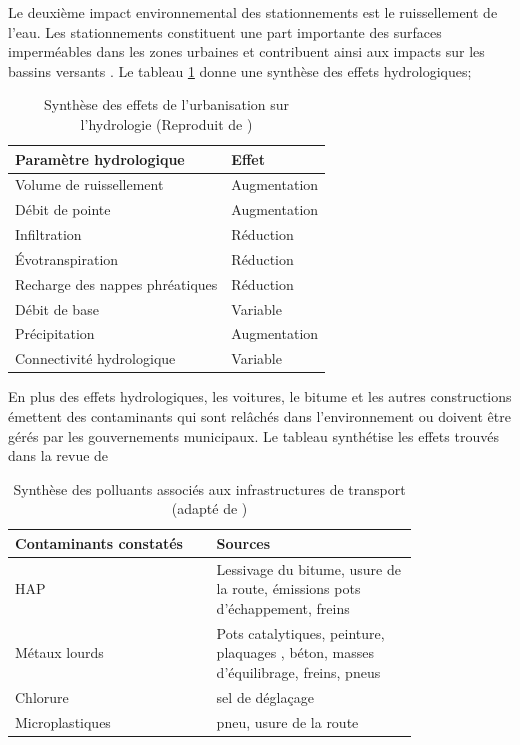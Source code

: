         Le deuxième impact environnemental des stationnements est le ruissellement de l'eau. Les stationnements constituent une part importante des surfaces imperméables dans les zones urbaines \parencite{hoehne_valley_2019,chester_inventorying_2022,davis_environmental_2010} et contribuent ainsi aux impacts sur les bassins versants \parencite{shaikh_impacts_2023}. Le tableau \ref{tab:urbanisation-effets-hydro} donne une synthèse des effets hydrologiques;
        \begin{table}[ht]
            \caption{Synthèse des effets de l'urbanisation sur l'hydrologie (Reproduit de \textcite{shaikh_impacts_2023})}
            \label{tab:urbanisation-effets-hydro}
            \centering
            \begin{tabular}{ll}
                \hline
                Paramètre hydrologique & Effet\\
                \hline
                Volume de ruissellement & Augmentation   \\
                Débit de pointe & Augmentation \\
                Infiltration & Réduction \\
                Évotranspiration & Réduction \\
                Recharge des nappes phréatiques & Réduction \\
                Débit de base & Variable \\
                Précipitation & Augmentation \\
                Connectivité hydrologique & Variable \\
                \hline
            \end{tabular}
            
        \end{table}
        En plus des effets hydrologiques, les voitures, le bitume et les autres constructions émettent des contaminants qui sont relâchés dans l'environnement ou doivent être gérés par les gouvernements municipaux. Le tableau synthétise les effets trouvés dans la revue de \textcite{muller_pollution_2020}
        \begin{table}[ht]
            \caption{Synthèse des polluants associés aux infrastructures de transport (adapté de \textcite{muller_pollution_2020})}
            \label{tab:polluants-hydro}
            \centering
            \begin{tabular}{p{0.4 \linewidth}p{0.4 \linewidth}}
                \hline
                Contaminants constatés & Sources\\
                \hline
                \ac{HAP} & Lessivage du bitume, usure de la route, émissions pots d'échappement, freins \\
                 Métaux lourds & Pots catalytiques, peinture, plaquages , béton, masses d'équilibrage, freins, pneus\\
                 Chlorure & sel de déglaçage\\
                 Microplastiques & pneu, usure de la route\\
                 \hline
            \end{tabular}
            
        \end{table}
